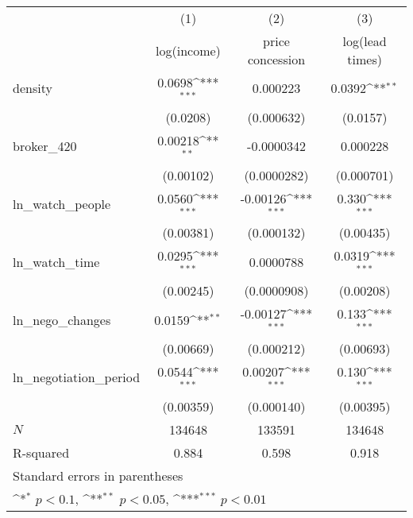 {
\def\sym#1{\ifmmode^{#1}\else\(^{#1}\)\fi}
\begin{tabular}{l*{3}{c}}
\toprule
            &\multicolumn{1}{c}{(1)}&\multicolumn{1}{c}{(2)}&\multicolumn{1}{c}{(3)}\\
            &\multicolumn{1}{c}{log(income)}&\multicolumn{1}{c}{price concession}&\multicolumn{1}{c}{log(lead times)}\\
\midrule
density     &      0.0698\sym{***}&    0.000223         &      0.0392\sym{**} \\
            &    (0.0208)         &  (0.000632)         &    (0.0157)         \\
\addlinespace
broker\_420  &     0.00218\sym{**} &  -0.0000342         &    0.000228         \\
            &   (0.00102)         & (0.0000282)         &  (0.000701)         \\
\addlinespace
ln\_watch\_people&      0.0560\sym{***}&    -0.00126\sym{***}&       0.330\sym{***}\\
            &   (0.00381)         &  (0.000132)         &   (0.00435)         \\
\addlinespace
ln\_watch\_time&      0.0295\sym{***}&   0.0000788         &      0.0319\sym{***}\\
            &   (0.00245)         & (0.0000908)         &   (0.00208)         \\
\addlinespace
ln\_nego\_changes&      0.0159\sym{**} &    -0.00127\sym{***}&       0.133\sym{***}\\
            &   (0.00669)         &  (0.000212)         &   (0.00693)         \\
\addlinespace
ln\_negotiation\_period&      0.0544\sym{***}&     0.00207\sym{***}&       0.130\sym{***}\\
            &   (0.00359)         &  (0.000140)         &   (0.00395)         \\
\midrule
\(N\)       &      134648         &      133591         &      134648         \\
R-squared   &       0.884         &       0.598         &       0.918         \\
\bottomrule
\multicolumn{4}{l}{\footnotesize Standard errors in parentheses}\\
\multicolumn{4}{l}{\footnotesize \sym{*} \(p<0.1\), \sym{**} \(p<0.05\), \sym{***} \(p<0.01\)}\\
\end{tabular}
}
